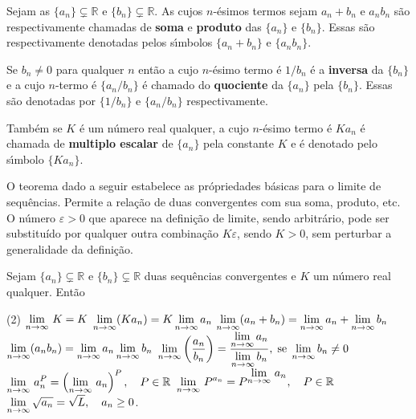 \begin{defic}{}{}
Sejam as \seqs $\{a_n\}\subsetneq \mathbb{R}$ e $\{b_n\}\subsetneq \mathbb{R}$. As \seqs cujos $n$-\'{e}simos
termos sejam $a_n+b_n$ e $a_nb_n$ s\~{a}o respectivamente
chamadas de \textbf{soma} e \textbf{produto} das
\seqs $\{a_n\}$ e $\{b_n\}$. Essas \seqs s\~{a}o respectivamente
denotadas pelos s\'{\i}mbolos $\{a_{n}+b_{n}\}$ e
$\{a_{n}b_{n}\}$.

Se $b_n\neq 0$ para qualquer $n$ ent\~{a}o a \seq cujo
$n$-\'{e}simo termo \'{e} $1/b_n$ \'{e} a \textbf{inversa} da \seq $\{b_n\}$ e
a \seq cujo $n$-termo \'{e} $\{a_n/b_n\}$ \'{e} chamado do
\textbf{quociente} da \seq $\{a_n\}$ pela \seq $\{b_n\}$. Essas
\seqs s\~{a}o denotadas por $\{1/b_n\}$ e $\{a_n/b_n\}$
respectivamente.

Tamb\'{e}m se $K$ \'{e} um n\'{u}mero real qualquer, a \seq
cujo $n$-\'{e}simo termo \'{e} $Ka_n$ \'{e} chamada de \textbf{multiplo escalar}
de $\{a_n\}$ pela constante $K$ e \'{e} denotado pelo s\'{\i}mbolo $\{Ka_n\}$.
\end{defic}

O teorema dado a seguir estabelece as pr\'{o}priedades b\'{a}sicas para o limite de sequ\^{e}ncias. Permite a rela\c{c}\~{a}o de duas \seq convergentes com sua
soma, produto, etc. O n\'{u}mero $\varepsilon>0$ que aparece na defini\c{c}\~{a}o de limite, sendo arbitr\'{a}rio, pode ser substituído por qualquer outra combina\c{c}\~{a}o $K\varepsilon$, sendo $K>0$, sem perturbar a generalidade da defini\c{c}\~{a}o.

\begin{fteo}\label{prop001}
Sejam $\{a_n\}\subsetneq \mathbb{R}$ e $\{b_n\}\subsetneq \mathbb{R}$ duas sequ\^{e}ncias convergentes e $K$ um n\'{u}mero
real qualquer. Ent\~{a}o
\begin{tasks}[label=\rm{(\alph*)},item-indent=2.8em,label-width=3ex,ref=(\alph*)](2)
\task \(\displaystyle{\lim_{n\to \infty}\,{K}_{}}=K\)
\task  \(\displaystyle\lim_{n\to\infty}(Ka_n)=K\lim_{n\to\infty}a_{n}\)
\task \(\displaystyle \lim_{n\to\infty}(a_n+b_n)=\lim_{n\to\infty}a_n+\lim_{n\to\infty}b_n\)
\task \(\displaystyle \lim_{n\to\infty}(a_nb_n)=\lim_{n\to\infty}a_n \lim_{n\to\infty}b_n\)
\task \(\displaystyle \lim_{n\to\infty}\left(\frac{a_n}{b_n}\right)=\frac{\displaystyle{\lim_{n\to\infty}a_n}}{\displaystyle{\lim_{n\to\infty}b_n}},
 \; \textrm{se}\; \lim_{n\to\infty}b_n\neq 0\)
\task \(\displaystyle \lim_{n\to\infty}\,a_n^P=\left(\lim_{n\to\infty}\,a_n\right)^{P},\quad P\in \mathbb{R}\)
\task \(\displaystyle \lim_{n\to\infty}\,P^{a_n}=P^{\displaystyle{\lim_{n\to\infty}\,a_n}},\quad P\in \mathbb{R}\)
\task \(\displaystyle \lim_{n\to\infty}\sqrt{a_n}=\sqrt{L},\quad a_n\geq 0\).
\end{tasks}
\end{fteo}

